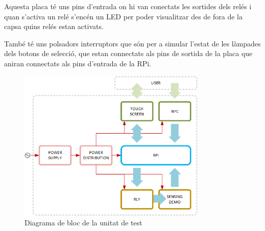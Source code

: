 Aquesta placa té uns pins d'entrada on hi van conectats les sortides dels relés i quan s'activa un relé s'encén un LED per poder visualitzar des de fora de la capsa quins relés estan activats.

També té uns polsadors interruptors que són per a simular l'estat de les làmpades dels botons de selecció, que estan connectats als pins de sortida de la placa que aniran connectats als pins d'entrada de la RPi.

\begin{figure}[H]
\center
\includegraphics[width=0.8\textwidth]{images/demonstrator_diagram}
\caption{Diagrama de bloc de la unitat de test}
\label{fig:demonstrator_diagram}
\end{figure}